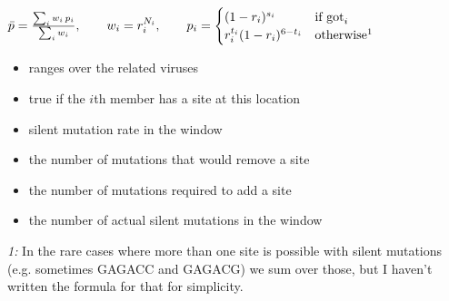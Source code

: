 \documentclass{article}
\begin{document}
$
\bar{p} = \frac{\sum_i w_i\, p_i}{\sum_i w_i},
\qquad
w_i = r_i^{N_i},
\qquad
p_i =
\begin{cases}
	(1-r_i)^{s_i} & \text{if } \text{got}_i \\
	r_i^{t_i}(1-r_i)^{6-t_i} & \text{otherwise} \footnotemark \\
\end{cases}
$
\begin{itemize}
	\item[$i$] ranges over the related viruses
	\item[$\text{got}_i$] true if the $i$th member has a site at this location
	\item[$r_i$] silent mutation rate in the window
	\item[$s_i$] the number of mutations that would remove a site
	\item[$t_i$] the number of mutations required to add a site
	\item[$N_i$] the number of actual silent mutations in the window
\end{itemize}
\begin{footnotesize}
\noindent\textit{1:} In the rare cases where more than one site is possible with silent mutations (e.g. sometimes GAGACC and GAGACG) we sum over those, but I haven't written the formula for that for simplicity.
\end{footnotesize}
\end{document}

